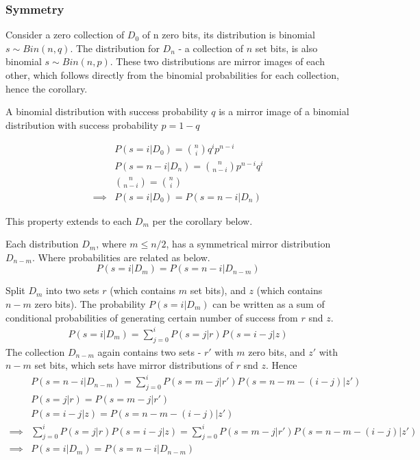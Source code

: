 \documentclass[11pt]{article}
\begin{document}
\subsubsection{Symmetry}

Consider a zero collection of $D_0$ of n zero bits, its distribution is  binomial $s \sim Bin(n,q)$.  The distribution for $D_n$ - a collection of $n$ set bits, is also binomial $s \sim Bin(n,p)$. These two distributions are mirror images of each other, which follows directly from the binomial probabilities for each collection, hence the corollary.
 \begin{cor}\label{cor:binsym}
 A binomial distribution with success probability $q$ is a mirror image of a binomial distribution with success probability $p=1-q$
 \begin{pf}
 \begin{align*}
& P(s=i | D_0) = \binom{n}{i} q^ip^{n-i} \\
&  P(s=n-i | D_n) = \binom{n}{n-i} p^{n-i} q^i \\
&  \binom{n}{n-i} = \binom{n}{i}  \\
\implies & P(s=i | D_0) = P(s=n-i | D_n)
 \end{align*}
 \end{pf}
 \end{cor}
 
 This property extends to each $D_m$ per the corollary  below.
 \begin{cor}\label{cor:sym}
Each distribution $D_m$, where $m \le n/2$, has a symmetrical mirror distribution $D_{n-m}$. Where probabilities are related as below.
\[ P(s=i | D_m) = P(s=n-i | D_{n-m}) \]
\begin{pf}
Split $D_m$ into two sets $r$ (which contains $m$ set bits), and $z$ (which contains $n-m$ zero bits).  The probability $P(s=i | D_m)$ can be written as a sum of conditional probabilities of generating certain number of success from $r$ snd $z$.
 \begin{align*}
 P(s=i | D_m) =  \sum_{j=0}^{i} P(s=j | r) P(s = i-j | z)
 \end{align*}
 The collection $D_{n-m}$ again contains two sets - $r'$ with $m$ zero bits, and $z'$ with $n-m$ set bits, which sets have mirror distributions of $r$ snd $z$. Hence
  \begin{align*}
 & P(s=n - i | D_{n-m}) =  \sum_{j=0}^{i} P(s= m - j | r') P(s = n - m - (i-j) | z') \\
 & P(s=j | r) = P(s= m - j | r')  \\
 & P(s = i-j | z) = P(s = n - m - (i-j) | z') \\
 \implies &   \sum_{j=0}^{i} P(s=j | r) P(s = i-j | z) = \sum_{j=0}^{i} P(s= m - j | r') P(s = n - m - (i-j) | z') \\
 \implies & P(s=i | D_m)  = P(s=n - i | D_{n-m})
 \end{align*}
\end{pf}
\end{cor}
\end{document}
